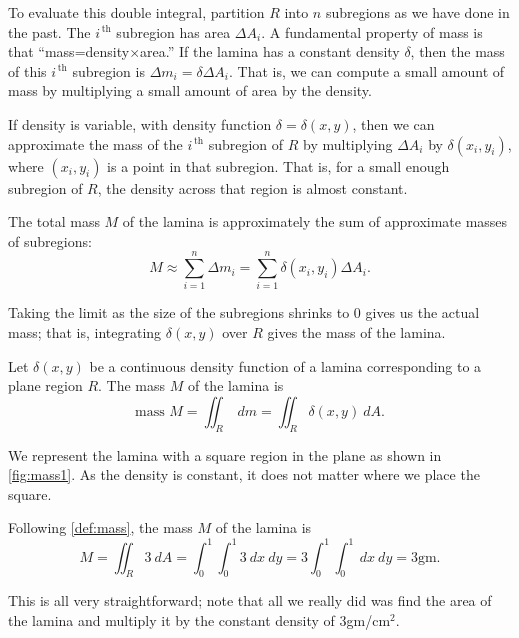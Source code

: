 To evaluate this double integral, partition $R$ into $n$ subregions as we have done in the past. The $i^{\,\text{th}}$ subregion has area $\Delta A_i$. 
A fundamental property of mass is that ``mass=density$\times$area.'' If the lamina has a constant density $\delta$, then the mass of this $i^{\,\text{th}}$ subregion is $\Delta m_i=\delta\Delta A_i$. %
That is, we can compute a small amount of mass by multiplying a small amount of area by the density.

If density is variable, with density function $\delta= \delta(x,y)$, then we can approximate the mass of the $i^{\,\text{th}}$ subregion of $R$ by multiplying $\Delta A_i$ by $\delta(x_i,y_i)$, where $(x_i,y_i)$ is a point in that subregion. That is, for a small enough subregion of $R$, the density across that region is almost constant. 


The total mass $M$ of the lamina is approximately the sum of approximate masses of subregions:
$$M \approx \sum_{i=1}^n \Delta m_i = \sum_{i=1}^n \delta(x_i,y_i)\Delta A_i.$$

Taking the limit as the size of the subregions shrinks to 0 gives us the actual mass; that is, integrating $\delta(x,y)$ over $R$ gives the mass of the lamina.

{Let $\delta(x,y)$ be a continuous density function of a lamina corresponding to a plane region $R$. The mass $M$ of the lamina is
$$\text{mass } M = \iint_R\ dm = \iint_R \delta(x,y)\ dA.$$
}

{We represent the lamina with a square region in the plane as shown in \autoref{fig:mass1}. As the density is constant, it does not matter where we place the square.

Following \autoref{def:mass}, the mass $M$ of the lamina is
$$M = \iint_R 3\ dA = \int_0^1\int_0^1 3\ dx\ dy = 3\int_0^1\int_0^1 \ dx\ dy=3\text{gm}.$$

This is all very straightforward; note that all we really did was find the area of the lamina and multiply it by the constant density of 3gm/cm$^2$.}

